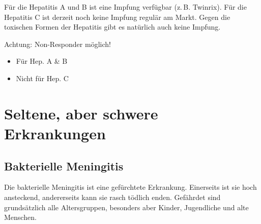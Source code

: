 {%
%
%
Für die Hepatitis A und B ist eine Impfung verfügbar (z.\,B.
Twinrix{\texttrademark}). Für die Hepatitis C ist derzeit
noch keine Impfung regulär am Markt. Gegen die toxischen
Formen der Hepatitis gibt es natürlich auch keine Impfung.

Achtung: Non-Responder möglich!
}{
\begin{itemize}
  \item Für Hep. A \& B
  \item Nicht für Hep. C
\end{itemize}
}
{}
{}
{}








\section{Seltene, aber schwere Erkrankungen}

\subsection{Bakterielle Meningitis}
\label{topic:meningitis}


\noindent Die bakterielle Meningitis ist eine gefürchtete
Erkrankung. Einerseits ist sie hoch ansteckend, andererseits
kann sie rasch tödlich enden. Gefährdet sind grundsätzlich
alle Altersgruppen, besonders aber Kinder, Jugendliche und
alte Menschen.
 
